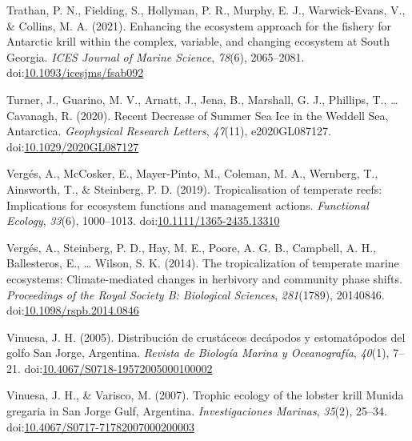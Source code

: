 \documentclass[
]{article}
\newlength{\cslhangindent}
\newlength{\cslentryspacingunit} %
\newenvironment{CSLReferences}[2] %
 {%
  \setlength{\parindent}{0pt}
  \ifodd #1
  \let\oldpar\par
  \def\par{\hangindent=\cslhangindent\oldpar}
  \fi
  \setlength{\parskip}{#2\cslentryspacingunit}
 }%
 {}
\begin{document}
\begin{CSLReferences}{1}{0}
\leavevmode{}%
Trathan, P. N., Fielding, S., Hollyman, P. R., Murphy, E. J.,
Warwick-Evans, V., \& Collins, M. A. (2021). Enhancing the ecosystem
approach for the fishery for {Antarctic} krill within the complex,
variable, and changing ecosystem at {South Georgia}. \emph{ICES Journal
of Marine Science}, \emph{78}(6), 2065--2081.
doi:\href{https://doi.org/10.1093/icesjms/fsab092}{10.1093/icesjms/fsab092}

\leavevmode{}%
Turner, J., Guarino, M. V., Arnatt, J., Jena, B., Marshall, G. J.,
Phillips, T., \ldots{} Cavanagh, R. (2020). Recent {Decrease} of {Summer
Sea Ice} in the {Weddell Sea}, {Antarctica}. \emph{Geophysical Research
Letters}, \emph{47}(11), e2020GL087127.
doi:\href{https://doi.org/10.1029/2020GL087127}{10.1029/2020GL087127}

\leavevmode{}%
Vergés, A., McCosker, E., Mayer-Pinto, M., Coleman, M. A., Wernberg, T.,
Ainsworth, T., \& Steinberg, P. D. (2019). Tropicalisation of temperate
reefs: {Implications} for ecosystem functions and management actions.
\emph{Functional Ecology}, \emph{33}(6), 1000--1013.
doi:\href{https://doi.org/10.1111/1365-2435.13310}{10.1111/1365-2435.13310}

\leavevmode{}%
Vergés, A., Steinberg, P. D., Hay, M. E., Poore, A. G. B., Campbell, A.
H., Ballesteros, E., \ldots{} Wilson, S. K. (2014). The tropicalization
of temperate marine ecosystems: Climate-mediated changes in herbivory
and community phase shifts. \emph{Proceedings of the Royal Society B:
Biological Sciences}, \emph{281}(1789), 20140846.
doi:\href{https://doi.org/10.1098/rspb.2014.0846}{10.1098/rspb.2014.0846}

\leavevmode{}%
Vinuesa, J. H. (2005). Distribución de crustáceos decápodos y
estomatópodos del golfo {San Jorge}, {Argentina}. \emph{Revista de
Biología Marina y Oceanografía}, \emph{40}(1), 7--21.
doi:\href{https://doi.org/10.4067/S0718-19572005000100002}{10.4067/S0718-19572005000100002}

\leavevmode{}%
Vinuesa, J. H., \& Varisco, M. (2007). Trophic ecology of the lobster
krill {Munida} gregaria in {San Jorge Gulf}, {Argentina}.
\emph{Investigaciones Marinas}, \emph{35}(2), 25--34.
doi:\href{https://doi.org/10.4067/S0717-71782007000200003}{10.4067/S0717-71782007000200003}


\end{CSLReferences}
\end{document}
